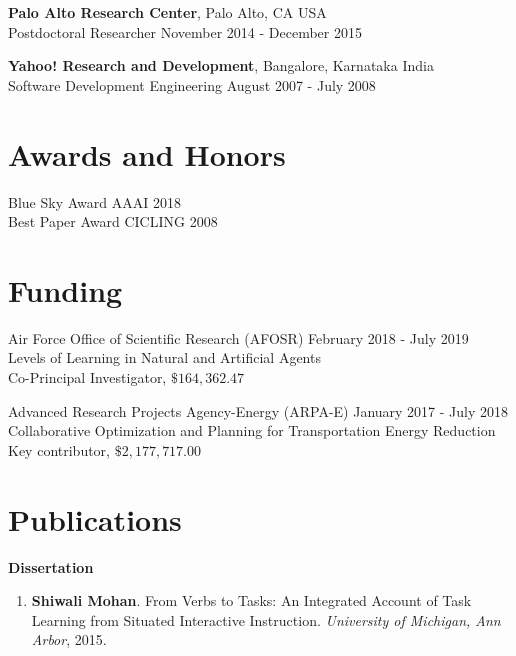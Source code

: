 \documentclass[margin,line,11pt]{res}
\begin{document}
\begin{resume}
          {\bf Palo Alto Research Center}, Palo Alto, CA USA \\
          {Postdoctoral Researcher} \hfill November 2014 - December 2015
          
          {\bf Yahoo! Research and Development}, Bangalore, Karnataka India \\
          {Software Development Engineering} \hfill August 2007 - July 2008


          \section{\sc Awards and Honors}
          Blue Sky Award \hfill AAAI 2018\\
          Best Paper Award \hfill CICLING 2008\\
          
          
          \section{\sc Funding}
          Air Force Office of Scientific Research (AFOSR) \hfill February 2018 - July 2019\\
          Levels of Learning in Natural and Artificial Agents\\
          Co-Principal Investigator, $\$164,362.47$
       
          Advanced Research Projects Agency-Energy (ARPA-E) \hfill January 2017 - July 2018 \\
          Collaborative Optimization and Planning for Transportation Energy Reduction\\
          Key contributor, $\$2,177,717.00$
          


\section{\sc Publications}
\textbf{Dissertation}
\begin{enumerate}[label=\lbrack D\arabic*\rbrack, leftmargin=*]
\item \textbf{Shiwali Mohan}.  From Verbs to Tasks: An Integrated Account of Task Learning from Situated Interactive Instruction. \emph{University of Michigan, Ann Arbor}, 2015.
\end{enumerate}


\end{resume}
\end{document}
